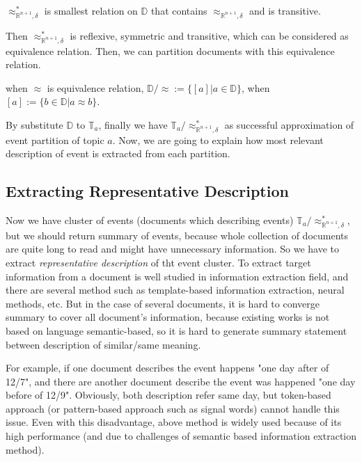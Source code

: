 \begin{definition}
    $\approx_{\mathbb{R}^{n+1}, \delta}^{*}$ is smallest relation on $\mathbb{D}$ that contains $\approx_{\mathbb{R}^{n+1}, \delta}$ and is transitive.
\end{definition}

Then $\approx_{\mathbb{R}^{n+1}, \delta}^{*}$ is reflexive, symmetric and transitive, which can be considered as equivalence relation.
Then, we can partition documents with this equivalence relation.

\begin{definition}
    when $\approx$ is equivalence relation, $\mathbb{D}/\approx := \{[a] | a \in \mathbb{D}\}$, when $[a] := \{b \in \mathbb{D} | a \approx b \}$.
\end{definition}

By substitute $\mathbb{D}$ to $\mathbb{T}_{a}$, finally we have $\mathbb{T}_{a}/\approx_{\mathbb{R}^{n+1}, \delta}^{*}$ as successful approximation 
of event partition of topic $a$. Now, we are going to explain how most relevant description of event is extracted from each partition.

\subsection{Extracting Representative Description}

Now we have cluster of events (documents which describing events) $\mathbb{T}_{a}/\approx_{\mathbb{R}^{n+1}, \delta}^{*}$, but we should
return summary of events, because whole collection of documents are quite long to read and might have
unnecessary information. So we have to extract \textit{representative description} of tht event cluster.
To extract target information from a document is well studied in information extraction field,
and there are several method such as template-based information extraction, neural methods, etc.
But in the case of several documents, it is hard to converge summary to cover all document's information,
because existing works is not based on language semantic-based, so it is hard to generate summary statement
between description of similar/same meaning. 

For example, if one document describes the event happens "one day after of 12/7", and there are another
document describe the event was happened "one day before of 12/9". Obviously, both description
refer same day, but token-based approach (or pattern-based approach such as signal words) cannot
handle this issue. Even with this disadvantage, above method is widely used because of
its high performance (and due to challenges of semantic based information extraction method).

